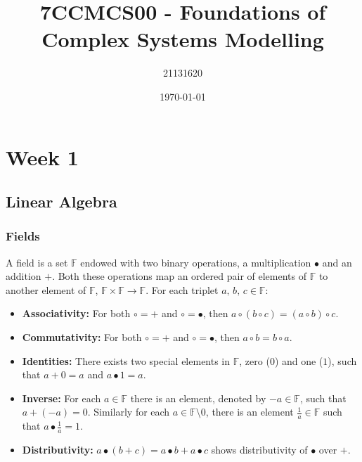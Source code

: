 \documentclass{article}
\title{7CCMCS00 - Foundations of Complex Systems Modelling}
\author{21131620}
\date{\today}
\begin{document}
\maketitle

\tableofcontents

\section{Week 1}
\subsection{Linear Algebra}
\subsubsection{Fields}
A field is a set $\mathbb{F}$ endowed with two binary operations, a multiplication $\bullet$ and an addition $+$. Both these operations map an ordered pair of elements of $\mathbb{F}$ to another element of $\mathbb{F}$, $\mathbb{F}\times\mathbb{F}\to\mathbb{F}$. For each triplet $a,\,b,\,c\in\mathbb{F}$:
\begin{itemize}
    \item \textbf{Associativity:} For both $\circ=+$ and $\circ=\bullet$, then $a\circ (b\circ c) = (a\circ b)\circ c$. 
    \item \textbf{Commutativity:} For both $\circ = +$ and $\circ = \bullet$, then $a\circ b=b\circ a$.
    \item \textbf{Identities:} There exists two special elements in $\mathbb{F}$, zero ($0$) and one ($1$), such that $a+0=a$ and $a\bullet1=a$.
    \item \textbf{Inverse:} For each $a\in\mathbb{F}$ there is an element, denoted by $-a\in\mathbb{F}$, such that $a+(-a)=0$. Similarly for each $a\in\mathbb{F}\setminus{0}$, there is an element $\frac{1}{a}\in\mathbb{F}$ such that $a\bullet\frac{1}{a}=1$. 
    \item \textbf{Distributivity:} $a\bullet(b+c) = a\bullet b + a\bullet c$ shows distributivity of $\bullet$ over $+$.
\end{itemize}
\end{document}

